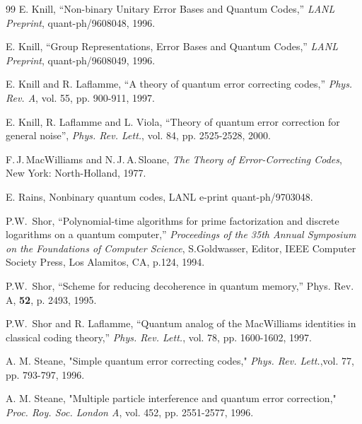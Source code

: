 \documentclass{article}
\begin{document}
\begin{thebibliography}{99}
 E. Knill, ``Non-binary Unitary Error Bases and
Quantum Codes,'' {\em LANL Preprint}, quant-ph/9608048, 1996. 

 E. Knill, ``Group Representations, Error Bases and
Quantum Codes,'' {\em LANL Preprint}, quant-ph/9608049, 1996. 

E. Knill and R. Laflamme, ``A theory of quantum error correcting codes,''
{\em Phys. Rev. A}, vol. 55, pp. 900-911,
   1997.

E. Knill, R. Laflamme and L. Viola, ``Theory of quantum error correction
for general noise'', \emph{Phys. Rev. Lett.}, vol. 84, pp. 2525-2528, 2000.

F.\,J.\,MacWilliams and N.\,J.\,A.\,Sloane,
{\em The Theory of Error-Correcting Codes},
New York: North-Holland, 1977.

 E. Rains, Nonbinary quantum codes, LANL e-print
quant-ph/9703048.

 P.W.~Shor, ``Polynomial-time algorithms for prime
factorization and discrete logarithms on a quantum computer,''
{\em Proceedings of the 35th Annual Symposium on the Foundations of Computer Science},
S.Goldwasser, Editor, IEEE Computer Society Press, Los Alamitos, CA, p.124,
1994.

 P.W.~Shor, ``Scheme for reducing decoherence in quantum
memory,'' Phys. Rev. A,
{\bf 52}, p. 2493, 1995.

P.W.~Shor and R. Laflamme, ``Quantum analog of the MacWilliams identities
in classical coding theory,'' {\em Phys. Rev. Lett.}, vol. 78, pp. 1600-1602, 
1997.

A. M. Steane,  "Simple quantum error correcting codes," {\em Phys. Rev. Lett.},vol. 77, pp. 793-797, 1996.

A. M. Steane, "Multiple particle interference and quantum
   error correction," {\em Proc. Roy. Soc. London A}, vol. 452, pp.
   2551-2577, 1996.





\end{thebibliography}


 
 
\end{document}
